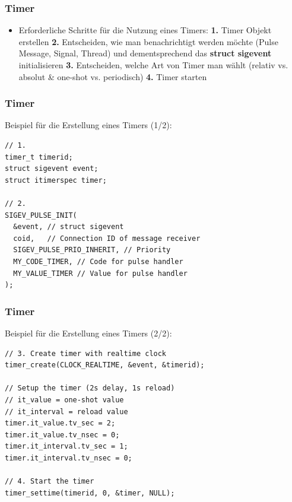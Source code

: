 \documentclass{beamer}
\begin{document}
\begin{frame}[fragile]
 \frametitle{Timer}
 \begin{itemize}
  \item Erforderliche Schritte f\"ur die Nutzung eines Timers:\newline\newline
  \textbf{1.} Timer Objekt erstellen\newline\newline
  \textbf{2.} Entscheiden, wie man benachrichtigt werden m\"ochte (Pulse Message, Signal, Thread) und dementsprechend das \textbf{struct sigevent} initialisieren\newline\newline
  \textbf{3.} Entscheiden, welche Art von Timer man w\"ahlt (relativ vs. absolut \& one-shot vs. periodisch)\newline\newline
  \textbf{4.} Timer starten
 \end{itemize}
\end{frame}

\begin{frame}[fragile]
 \frametitle{Timer}
 Beispiel f\"ur die Erstellung eines Timers (1/2):
 \begin{lstlisting}[frame=single]
// 1.
timer_t timerid;
struct sigevent event;
struct itimerspec timer;

// 2.
SIGEV_PULSE_INIT(
  &event, // struct sigevent
  coid,   // Connection ID of message receiver
  SIGEV_PULSE_PRIO_INHERIT, // Priority
  MY_CODE_TIMER, // Code for pulse handler
  MY_VALUE_TIMER // Value for pulse handler
);
 \end{lstlisting}
\end{frame}

\begin{frame}[fragile]
 \frametitle{Timer}
 Beispiel f\"ur die Erstellung eines Timers (2/2):
 \begin{lstlisting}[frame=single]
// 3. Create timer with realtime clock
timer_create(CLOCK_REALTIME, &event, &timerid);

// Setup the timer (2s delay, 1s reload)
// it_value = one-shot value
// it_interval = reload value
timer.it_value.tv_sec = 2;
timer.it_value.tv_nsec = 0;
timer.it_interval.tv_sec = 1;
timer.it_interval.tv_nsec = 0;

// 4. Start the timer
timer_settime(timerid, 0, &timer, NULL);
 \end{lstlisting}
\end{frame}
\end{document}
